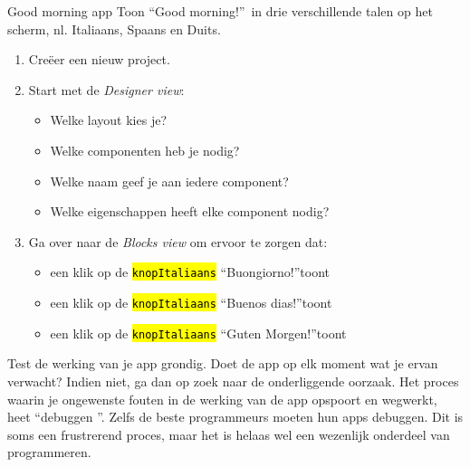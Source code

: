 \begin{opdracht}{Good morning app}
	Toon \textquotedblleft Good morning!\textquotedblright \ in drie verschillende talen op het scherm, nl. Italiaans, Spaans en Duits.
	
	\begin{minipage}{.5\linewidth}
	\end{minipage}
	\begin{minipage}{.5\linewidth}
		\begin{enumerate}
			\item Cre\"eer een nieuw project.
			\item Start met de \emph{Designer view}:
			\begin{itemize}
				\item Welke layout kies je?
				\item Welke componenten heb je nodig?
				\item Welke naam geef je aan iedere component?
				\item Welke eigenschappen heeft elke component nodig?
			\end{itemize}
			\item Ga over naar de \emph{Blocks view} om ervoor te zorgen dat:
			\begin{itemize}
				\item een klik op de \hl{\texttt{knopItaliaans}} \textquotedblleft Buongiorno!\textquotedblright toont
				\item een klik op de \hl{\texttt{knopItaliaans}} \textquotedblleft Buenos dias!\textquotedblright toont
				\item een klik op de \hl{\texttt{knopItaliaans}} \textquotedblleft Guten Morgen!\textquotedblright toont
			\end{itemize}
		\end{enumerate}
	\end{minipage}

Test de werking van je app grondig. Doet de app op elk moment wat je ervan verwacht? Indien niet, ga dan op zoek naar de onderliggende oorzaak. Het proces waarin je ongewenste fouten in de werking van de app opspoort en wegwerkt, heet \textquotedblleft debuggen \textquotedblright. Zelfs de beste programmeurs moeten hun apps debuggen. Dit is soms een frustrerend proces, maar het is helaas wel een wezenlijk onderdeel van programmeren.

\end{opdracht}

